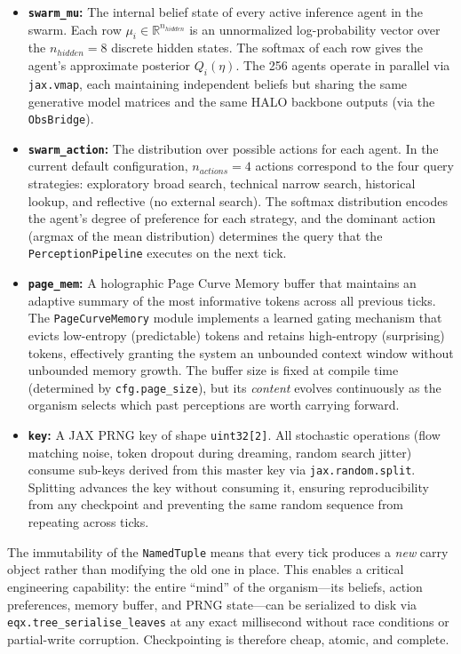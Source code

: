 \begin{itemize}
    \item \textbf{\texttt{swarm\_mu}:} The internal belief state of every active inference agent in the swarm. Each row $\mu_i \in \mathbb{R}^{n_{hidden}}$ is an unnormalized log-probability vector over the $n_{hidden} = 8$ discrete hidden states. The softmax of each row gives the agent's approximate posterior $Q_i(\eta)$. The 256 agents operate in parallel via \texttt{jax.vmap}, each maintaining independent beliefs but sharing the same generative model matrices and the same HALO backbone outputs (via the \texttt{ObsBridge}).

    \item \textbf{\texttt{swarm\_action}:} The distribution over possible actions for each agent. In the current default configuration, $n_{actions} = 4$ actions correspond to the four query strategies: exploratory broad search, technical narrow search, historical lookup, and reflective (no external search). The softmax distribution encodes the agent's degree of preference for each strategy, and the dominant action (argmax of the mean distribution) determines the query that the \texttt{PerceptionPipeline} executes on the next tick.

    \item \textbf{\texttt{page\_mem}:} A holographic Page Curve Memory buffer that maintains an adaptive summary of the most informative tokens across all previous ticks. The \texttt{PageCurveMemory} module implements a learned gating mechanism that evicts low-entropy (predictable) tokens and retains high-entropy (surprising) tokens, effectively granting the system an unbounded context window without unbounded memory growth. The buffer size is fixed at compile time (determined by \texttt{cfg.page\_size}), but its \textit{content} evolves continuously as the organism selects which past perceptions are worth carrying forward.

    \item \textbf{\texttt{key}:} A JAX PRNG key of shape \texttt{uint32[2]}. All stochastic operations (flow matching noise, token dropout during dreaming, random search jitter) consume sub-keys derived from this master key via \texttt{jax.random.split}. Splitting advances the key without consuming it, ensuring reproducibility from any checkpoint and preventing the same random sequence from repeating across ticks.
\end{itemize}

The immutability of the \texttt{NamedTuple} means that every tick produces a \textit{new} carry object rather than modifying the old one in place. This enables a critical engineering capability: the entire ``mind'' of the organism---its beliefs, action preferences, memory buffer, and PRNG state---can be serialized to disk via \texttt{eqx.tree\_serialise\_leaves} at any exact millisecond without race conditions or partial-write corruption. Checkpointing is therefore cheap, atomic, and complete.

